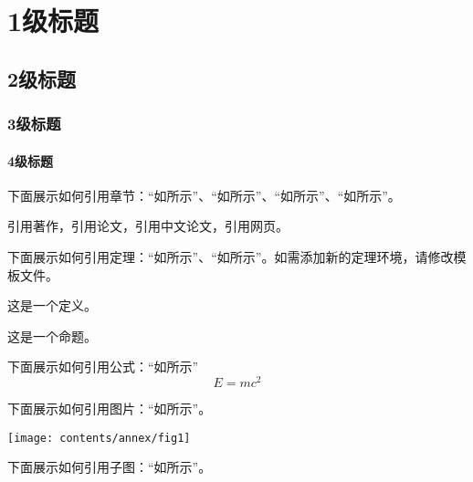 \chapter{1级标题}\label{cha_one}
\section{2级标题}\label{sec_two}
\subsection{3级标题}\label{subsec_three}
\subsubsection{4级标题}\label{subsubsec_four}

下面展示如何引用章节：“如所示”、“如所示”、“如所示”、“如所示”。

引用著作，引用论文，引用中文论文，引用网页。

下面展示如何引用定理：“如所示”、“如所示”。如需添加新的定理环境，请修改模板文件。
\begin{defn}\label{def_1}
	这是一个定义。
\end{defn}
\begin{prop}\label{prop_2}
	这是一个命题。
\end{prop}

下面展示如何引用公式：“如所示”
\begin{equation}\label{eq_emc}
	E=mc^2
\end{equation}

下面展示如何引用图片：“如所示”。

\begin{bjtufigure}
\texttt{[image: contents/annex/fig1]}
\end{bjtufigure}

下面展示如何引用子图：“如所示”。

\begin{bjtufigure}
\end{bjtufigure}



